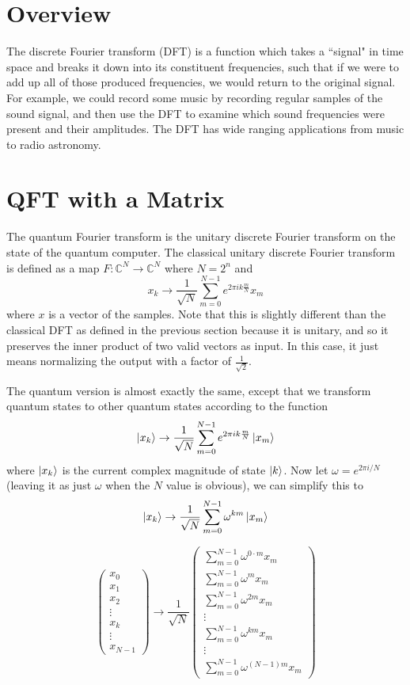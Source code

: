 \documentclass[11pt]{report}
\newcommand{\?}{\stackrel{?}{=}}
\begin{document}
\section{Overview}
The discrete Fourier transform (DFT) is a function which takes a ``signal" in time space and breaks it down into its constituent frequencies, such that if we were to add up all of those produced frequencies, we would return to the original signal. For example, we could record some music by recording regular samples of the sound signal, and then use the DFT to examine which sound frequencies were present and their amplitudes. The DFT has wide ranging applications from music to radio astronomy.

\section{QFT with a Matrix}

The quantum Fourier transform is the unitary discrete Fourier transform on the state of the quantum computer. The classical unitary discrete Fourier transform is defined as a map $F: \mathbb{C}^N \to \mathbb{C}^N$ where $N = 2^n$ and
$$x_k \to \frac{1}{\sqrt{N}}\sum_{m = 0}^{N - 1}e^{2\pi i k \frac{m}{N}} x_m$$
where $x$ is a vector of the samples. Note that this is slightly different than the classical DFT as defined in the previous section because it is unitary, and so it preserves the inner product of two valid vectors as input. In this case, it just means normalizing the output with a factor of $\frac{1}{\sqrt{2}}$. 

The quantum version is almost exactly the same, except that we transform quantum states to other quantum states according to the function
$$\Ket{x_k} \to \frac{1}{\sqrt{N}}\sum_{m = 0}^{N - 1}e^{2\pi i k \frac{m}{N}} \Ket{x_m}$$
where $\Ket{x_k}$ is the current complex magnitude of state $\Ket{k}$. Now let $\omega = e^{2\pi i /N}$ (leaving it as just $\omega$ when the $N$ value is obvious), we can simplify this to
$$\Ket{x_k} \to \frac{1}{\sqrt{N}}\sum_{m = 0}^{N - 1}\omega^{km} \Ket{x_m}$$

$$\begin{pmatrix}
	x_0 \\
	x_1 \\
	x_2 \\
	\vdots \\
    x_k \\
    \vdots \\
    x_{N-1}
  \end{pmatrix}
\to \frac{1}{\sqrt{N}}
  \begin{pmatrix}
	\sum_{m=0}^{N-1} \omega^{0\cdot m} x_m\\
	\sum_{m=0}^{N-1} \omega^{m} x_m \\
	\sum_{m=0}^{N-1} \omega^{2m} x_m \\
	\vdots \\
    \sum_{m=0}^{N-1} \omega^{km} x_m \\
    \vdots \\
    \sum_{m=0}^{N-1} \omega^{(N-1)m} x_m
  \end{pmatrix}
$$
\end{document}
